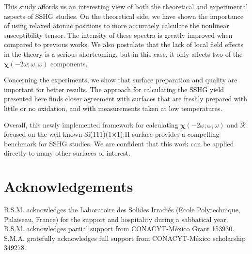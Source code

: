 \documentclass[prb,superscriptaddress,showpacs,twocolumn,letterpaper]{revtex4}
\begin{document}
This study affords us an interesting view of both the theoretical and
experimental aspects of SSHG studies. On the theoretical side, we have shown the
importance of using relaxed atomic positions to more accurately calculate the
nonlinear susceptibility tensor. The intensity of these spectra is greatly
improved when compared to previous works.\cite{mejiaPRB02} We also postulate
that the lack of local field effects in the theory is a serious shortcoming, but
in this case, it only affects two of the
$\boldsymbol{\chi}(-2\omega;\omega,\omega)$ components.

Concerning the experiments, we show that surface preparation and quality are
important for better results. The approach for calculating the SSHG yield
presented here finds closer agreement with surfaces that are freshly prepared
with little or no oxidation, and with measurements taken at low temperatures.

Overall, this newly implemented framework for calculating
$\boldsymbol{\chi}(-2\omega;\omega,\omega)$ and $\mathcal{R}$ focused on the
well-known Si(111)(1$\times$1):H surface provides a compelling benchmark for
SSHG studies. We are confident that this work can be applied directly to many
other surfaces of interest.


\section{Acknowledgements}\label{sec:acknowledgements}

B.S.M. acknowledges the Laboratoire des Solides Irradi\'es (Ecole Polytechnique,
Palaiseau, France) for the support and hospitality during a sabbatical year.
B.S.M. acknowledges partial support from CONACYT-M\'exico Grant 153930. S.M.A.
gratefully acknowledges full support from CONACYT-M\'exico scholarship 349278.



\end{document}

